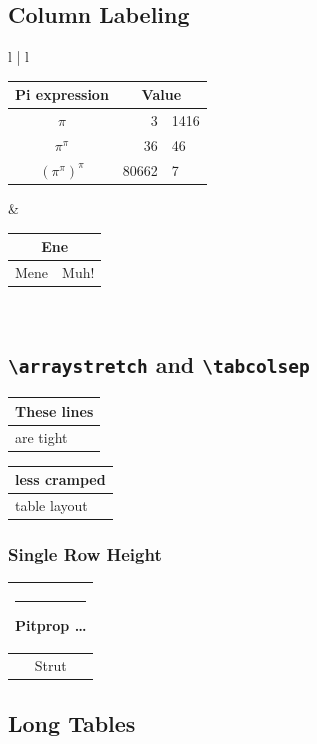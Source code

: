 \documentclass[a4paper]{article}
\begin{document}
\subsection*{Column Labeling}
\begin{tabular}{l | l}
\hline \\
\begin{tabular}{c r @{.} l}
Pi expression       &
\multicolumn{2}{c}{Value} \\
\hline
$\pi$               & 3&1416  \\
$\pi^{\pi}$         & 36&46   \\
$(\pi^{\pi})^{\pi}$ & 80662&7 \\
\end{tabular} &
\begin{tabular}{|c|c|}
\hline
\multicolumn{2}{|c|}{Ene} \\
\hline
Mene & Muh! \\
\hline
\end{tabular}\\
\hline
\end{tabular}

\newpage
\subsection{\texttt{\textbackslash{}arraystretch} and \texttt{\textbackslash{}tabcolsep}}
\begin{tabular}{|l|}
\hline
These lines\\\hline
are tight\\\hline
\end{tabular}
{\renewcommand{\arraystretch}{1.5}
\renewcommand{\tabcolsep}{0.2cm}
\begin{tabular}{|l|}
\hline
less cramped\\\hline
table layout\\\hline
\end{tabular}}

\subsubsection*{Single Row Height}
\begin{tabular}{|c|}
\hline
\rule{1pt}{4ex}Pitprop \ldots\\
\hline
\rule{0pt}{4ex}Strut\\
\hline
\end{tabular}

\newpage
\subsection{Long Tables}
\end{document}
